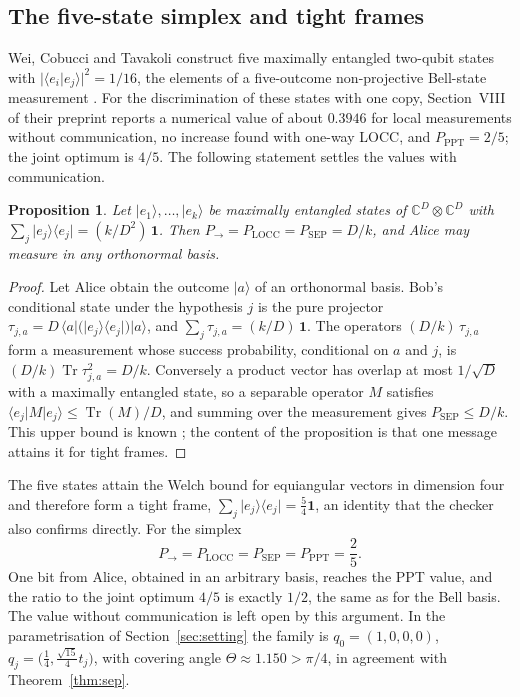 \documentclass[11pt,a4paper]{article}
\newtheorem{proposition}[theorem]{Proposition}
\theoremstyle{definition}
\theoremstyle{plain}
\DeclareMathOperator{\Tr}{Tr}
\newcommand{\ket}[1]{\lvert#1\rangle}
\newcommand{\bra}[1]{\langle#1\rvert}
\newcommand{\braket}[2]{\langle#1\vert#2\rangle}
\newcommand{\one}{\mathbf{1}}
\newcommand{\Pow}{P_{\to}}
\newcommand{\Psep}{P_{\mathrm{SEP}}}
\newcommand{\Plocc}{P_{\mathrm{LOCC}}}
\newcommand{\Pppt}{P_{\mathrm{PPT}}}
\begin{document}
\subsection{The five-state simplex and tight frames}\label{sec:simplex}
Wei, Cobucci and Tavakoli construct five maximally entangled two-qubit states
with $\lvert\braket{e_i}{e_j}\rvert^2=1/16$, the elements of a five-outcome
non-projective Bell-state measurement \cite{Wei2024}. For the discrimination
of these states with one copy, Section~VIII of their preprint reports a
numerical value of about $0.3946$ for local measurements without
communication, no increase found with one-way LOCC, and $\Pppt=2/5$; the
joint optimum is $4/5$. The following statement settles the values with communication.

\begin{proposition}\label{prop:frame}
Let $\ket{e_1},\dots,\ket{e_k}$ be maximally entangled states of
$\mathbb C^D\otimes\mathbb C^D$ with
$\sum_j\ket{e_j}\bra{e_j}=(k/D^2)\,\one$. Then
$\Pow=\Plocc=\Psep=D/k$, and Alice may measure in any orthonormal basis.
\end{proposition}
\begin{proof}
Let Alice obtain the outcome $\ket a$ of an orthonormal basis. Bob's
conditional state under the hypothesis $j$ is the pure projector
$\tau_{j,a}=D\,\bra a\bigl(\ket{e_j}\bra{e_j}\bigr)\ket a$, and
$\sum_j\tau_{j,a}=(k/D)\,\one$. The operators $(D/k)\,\tau_{j,a}$ form a
measurement whose success probability, conditional on $a$ and $j$, is
$(D/k)\Tr\tau_{j,a}^2=D/k$. Conversely a product vector has overlap at most
$1/\sqrt D$ with a maximally entangled state, so a separable operator $M$
satisfies $\bra{e_j}M\ket{e_j}\le\Tr(M)/D$, and summing over the measurement
gives $\Psep\le D/k$. This upper bound is known
\cite{Nathanson2005,BandyopadhyayNathanson2013}; the content of the
proposition is that one message attains it for tight frames.
\end{proof}

The five states attain the Welch bound for equiangular vectors in dimension
four and therefore form a tight frame,
$\sum_j\ket{e_j}\bra{e_j}=\tfrac54\one$, an identity that the checker also
confirms directly. For the simplex
\[
\Pow=\Plocc=\Psep=\Pppt=\frac25 .
\]
One bit from Alice, obtained in an arbitrary basis, reaches the PPT value, and
the ratio to the joint optimum $4/5$ is exactly $1/2$, the same as for the
Bell basis. The value without communication is left open by this argument.
In the parametrisation of Section~\ref{sec:setting} the family is
$q_0=(1,0,0,0)$, $q_j=\bigl(\tfrac14,\tfrac{\sqrt{15}}4t_j\bigr)$, with
covering angle $\Theta\approx1.150>\pi/4$, in agreement with
Theorem~\ref{thm:sep}.
\end{document}
